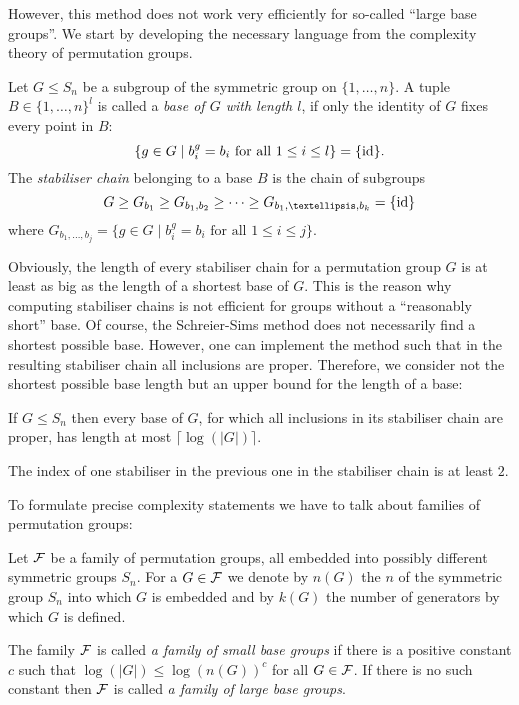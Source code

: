 However, this method does not work very efficiently for so-called
``large base groups''. We start by developing the necessary language
from the complexity theory of permutation groups.

\begin{Def}
Let $G \le S_n$ be a subgroup of the symmetric group on $\{1,\ldots,n\}$.
A tuple $B \in \{ 1, \ldots, n\}^l$ is called a \emph{base of $G$ with
length $l$}, if only the identity of $G$ fixes every point in $B$: 
\[ \{ g \in G \mid b_i^g = b_i \mbox{ for all } 1 \le i \le l \} = \{ \id \}. \]
The \emph{stabiliser chain} belonging to a base $B$ is the chain of
subgroups
\[ G \ge G_{b_1} \ge G_{b_1,b_2} \ge \cdots \ge G_{b_1,\ldots,b_k} =
\{\id\} \]
where $G_{b_1, \ldots, b_j} =
\{ g \in G \mid b_i^g = b_i \mbox{ for all } 1 \le i \le j \}$.
\end{Def}

Obviously, the length of every stabiliser chain for a permutation group 
$G$ is at least as big as the length of a shortest base of $G$.
This is the reason why computing stabiliser chains is not efficient
for groups without a ``reasonably short'' base. Of course, the
Schreier-Sims method does not necessarily find a shortest possible base.
However, one can implement the method such that in the resulting
stabiliser chain all inclusions are proper.
Therefore, we consider not the shortest possible base length but
an upper bound for the length of a base:

\begin{Prop}
If $G \le S_n$ then every base of $G$, for which all inclusions in its
stabiliser chain are proper, has length at most $\lceil \log(|G|) \rceil$.
\end{Prop}
\proofbeg
The index of one stabiliser in the previous one in the stabiliser chain is
at least $2$.
\proofend

To formulate precise complexity statements we have to talk about families
of permutation groups:

\begin{Def}
Let $\mathcal{F}$ be a family of permutation groups, all embedded into
possibly different symmetric groups $S_n$. For a $G \in \mathcal{F}$ we denote 
by $n(G)$ the $n$ of the symmetric group $S_n$ into which $G$ is embedded
and by $k(G)$ the number of generators by which $G$ is defined.

The family $\mathcal{F}$ is called \emph{a family of small base groups} if there
is a positive constant $c$ such that $\log(|G|) \le \log(n(G))^c$ for all
$G \in \mathcal{F}$. If there is no such constant then $\mathcal{F}$ is called
\emph{a family of large base groups}.
\end{Def}

